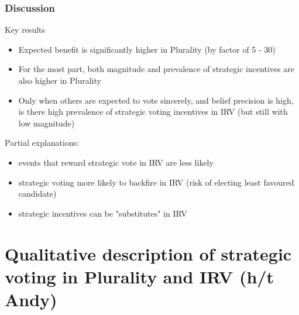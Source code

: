 \documentclass[10pt, en-GB]{beamer}
\begin{document}
\begin{frame}[t]\frametitle{Discussion}
    
\begin{alertblock}{Key results}
\begin{itemize}[<+->]
\item Expected benefit is significantly higher in Plurality (by factor of 5 - 30)
\item For the most part, both magnitude and prevalence of strategic incentives are also higher in Plurality
\item Only when others are expected to vote sincerely, and belief precision is high, is there high prevalence of strategic voting incentives in IRV (but still with low magnitude)
\end{itemize}
\end{alertblock}

Partial explanations:
\begin{itemize}[<+->]
	\item events that reward strategic vote in IRV are less likely
	\item strategic voting more likely to backfire in IRV (risk of electing least favoured candidate)
	\item strategic incentives can be "substitutes" in IRV
\end{itemize}
\hyperlink{disc}{}

\end{frame}

\appendix

\section{Qualitative description of strategic voting in Plurality and IRV (h/t Andy)}
\label{strat_qual}
\end{document}
